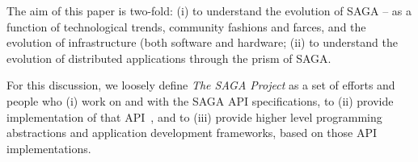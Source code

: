 \documentclass[]{article}
\newcommand{\I}[1]{\textit{#1}}
\begin{document}
The aim of this paper is two-fold: (i) to understand the evolution of
SAGA -- as a function of technological trends, community fashions and
farces, and the evolution of infrastructure (both software and
hardware; (ii) to understand the evolution of distributed applications
through the prism of SAGA.

For this discussion, we loosely define \I{The SAGA Project} as a set
of efforts and people who (i) work on and with the SAGA API
specifications\cite{saga-core}, to (ii) provide
implementation of that API~\cite{saga-c++,jsaga,javasaga},
and to (iii)
provide higher level programming abstractions and application
development frameworks, based on those API
implementations\cite{bigjob_cloudcom10}.

 

 
\end{document}
